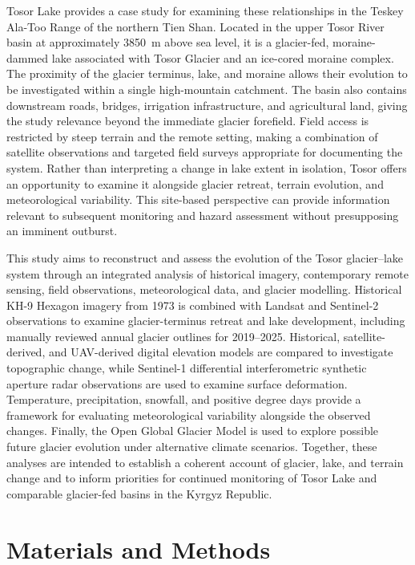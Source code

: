 \documentclass[geosciences,article,submit,moreauthors]{Definitions/mdpi}
\begin{document}
Tosor Lake provides a case study for examining these relationships in the Teskey Ala-Too Range of the northern Tien Shan. Located in the upper Tosor River basin at approximately 3850~m above sea level, it is a glacier-fed, moraine-dammed lake associated with Tosor Glacier and an ice-cored moraine complex. The proximity of the glacier terminus, lake, and moraine allows their evolution to be investigated within a single high-mountain catchment. The basin also contains downstream roads, bridges, irrigation infrastructure, and agricultural land, giving the study relevance beyond the immediate glacier forefield. Field access is restricted by steep terrain and the remote setting, making a combination of satellite observations and targeted field surveys appropriate for documenting the system. Rather than interpreting a change in lake extent in isolation, Tosor offers an opportunity to examine it alongside glacier retreat, terrain evolution, and meteorological variability. This site-based perspective can provide information relevant to subsequent monitoring and hazard assessment without presupposing an imminent outburst.

This study aims to reconstruct and assess the evolution of the Tosor glacier--lake system through an integrated analysis of historical imagery, contemporary remote sensing, field observations, meteorological data, and glacier modelling. Historical KH-9 Hexagon imagery from 1973 is combined with Landsat and Sentinel-2 observations to examine glacier-terminus retreat and lake development, including manually reviewed annual glacier outlines for 2019--2025. Historical, satellite-derived, and UAV-derived digital elevation models are compared to investigate topographic change, while Sentinel-1 differential interferometric synthetic aperture radar observations are used to examine surface deformation. Temperature, precipitation, snowfall, and positive degree days provide a framework for evaluating meteorological variability alongside the observed changes. Finally, the Open Global Glacier Model is used to explore possible future glacier evolution under alternative climate scenarios. Together, these analyses are intended to establish a coherent account of glacier, lake, and terrain change and to inform priorities for continued monitoring of Tosor Lake and comparable glacier-fed basins in the Kyrgyz Republic.

\section{Materials and Methods}
\end{document}

